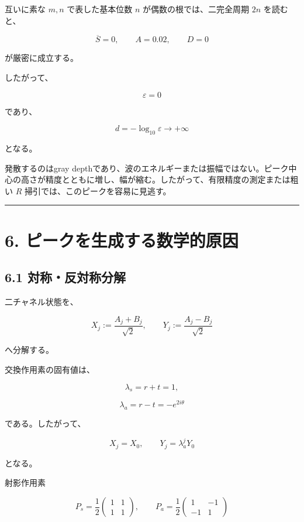 \documentclass[
  10pt,
  a4paper,
]{article}
\begin{document}
互いに素な \(m,n\) で表した基本位数 \(n\) が偶数の根では、二完全周期
\(2n\) を読むと、

\[
\overline S=0,
\qquad
A=0.02,
\qquad
D=0
\]

が厳密に成立する。

したがって、

\[
\varepsilon=0
\]

であり、

\[
d=-\log_{10}\varepsilon
\longrightarrow+\infty
\]

となる。

発散するのはgray
depthであり、波のエネルギーまたは振幅ではない。ピーク中心の高さが精度とともに増し、幅が縮む。したがって、有限精度の測定または粗い
\(R\) 掃引では、このピークを容易に見逃す。

\begin{center}\rule{0.5\linewidth}{0.5pt}\end{center}

\section{6.
ピークを生成する数学的原因}\label{ux30d4ux30fcux30afux3092ux751fux6210ux3059ux308bux6570ux5b66ux7684ux539fux56e0}

\subsection{6.1
対称・反対称分解}\label{ux5bfeux79f0ux53cdux5bfeux79f0ux5206ux89e3}

二チャネル状態を、

\[
X_j:=\frac{A_j+B_j}{\sqrt2},
\qquad
Y_j:=\frac{A_j-B_j}{\sqrt2}
\]

へ分解する。

交換作用素の固有値は、

\[
\lambda_s=r+t=1,
\]

\[
\lambda_a=r-t=-e^{2i\theta}
\]

である。したがって、

\[
X_j=X_0,
\qquad
Y_j=\lambda_a^jY_0
\]

となる。

射影作用素

\[
P_s=\frac12
\begin{pmatrix}
1&1\\1&1
\end{pmatrix},
\qquad
P_a=\frac12
\begin{pmatrix}
1&-1\\-1&1
\end{pmatrix}
\]
\end{document}
